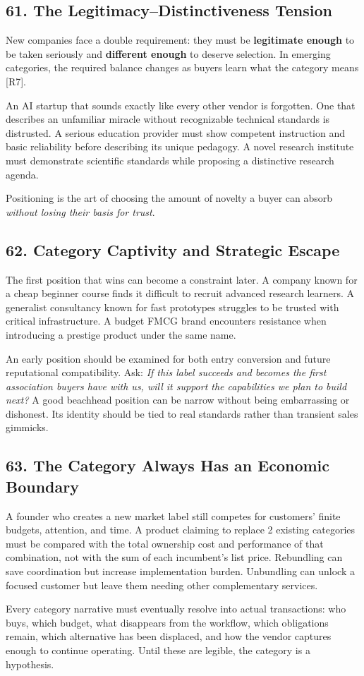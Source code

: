 \subsection*{61. The Legitimacy--Distinctiveness Tension}

New companies face a double requirement: they must be \textbf{legitimate enough} to be taken seriously and \textbf{different enough} to deserve selection. In emerging categories, the required balance changes as buyers learn what the category means [R7].

An AI startup that sounds exactly like every other vendor is forgotten. One that describes an unfamiliar miracle without recognizable technical standards is distrusted. A serious education provider must show competent instruction and basic reliability before describing its unique pedagogy. A novel research institute must demonstrate scientific standards while proposing a distinctive research agenda.

Positioning is the art of choosing the amount of novelty a buyer can absorb \emph{without losing their basis for trust}.

\subsection*{62. Category Captivity and Strategic Escape}

The first position that wins can become a constraint later. A company known for a cheap beginner course finds it difficult to recruit advanced research learners. A generalist consultancy known for fast prototypes struggles to be trusted with critical infrastructure. A budget FMCG brand encounters resistance when introducing a prestige product under the same name.

An early position should be examined for both entry conversion and future reputational compatibility. Ask: \emph{If this label succeeds and becomes the first association buyers have with us, will it support the capabilities we plan to build next?} A good beachhead position can be narrow without being embarrassing or dishonest. Its identity should be tied to real standards rather than transient sales gimmicks.

\subsection*{63. The Category Always Has an Economic Boundary}

A founder who creates a new market label still competes for customers' finite budgets, attention, and time. A product claiming to replace 2 existing categories must be compared with the total ownership cost and performance of that combination, not with the sum of each incumbent's list price. Rebundling can save coordination but increase implementation burden. Unbundling can unlock a focused customer but leave them needing other complementary services.

Every category narrative must eventually resolve into actual transactions: who buys, which budget, what disappears from the workflow, which obligations remain, which alternative has been displaced, and how the vendor captures enough to continue operating. Until these are legible, the category is a hypothesis.
